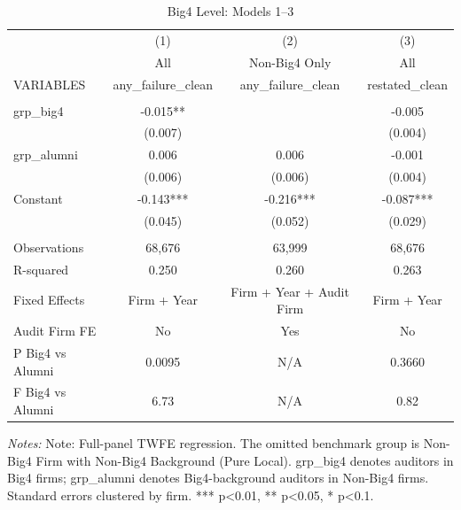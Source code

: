 \begin{table}[htbp]
\footnotesize
\centering
\caption{Big4 Level: Models 1--3}
\begin{threeparttable}
\begin{tabular}{p{}ccc}
\toprule
 & (1) & (2) & (3) \\
 & All & Non-Big4 Only & All \\
VARIABLES & any\_failure\_clean & any\_failure\_clean & restated\_clean \\
\midrule
 &  &  &  \\
grp\_big4 & -0.015** &  & -0.005 \\
 & (0.007) &  & (0.004) \\
grp\_alumni & 0.006 & 0.006 & -0.001 \\
 & (0.006) & (0.006) & (0.004) \\
Constant & -0.143*** & -0.216*** & -0.087*** \\
 & (0.045) & (0.052) & (0.029) \\
 &  &  &  \\
Observations & 68,676 & 63,999 & 68,676 \\
R-squared & 0.250 & 0.260 & 0.263 \\
Fixed Effects & Firm + Year & Firm + Year + Audit Firm & Firm + Year \\
Audit Firm FE & No & Yes & No \\
P Big4 vs Alumni & 0.0095 & N/A & 0.3660 \\
F Big4 vs Alumni & 6.73 & N/A & 0.82 \\
\bottomrule
\end{tabular}
\begin{tablenotes}\footnotesize
\item \raggedright \textit{Notes:} Note: Full-panel TWFE regression. The omitted benchmark group is Non-Big4 Firm with Non-Big4 Background (Pure Local). grp\_big4 denotes auditors in Big4 firms; grp\_alumni denotes Big4-background auditors in Non-Big4 firms. Standard errors clustered by firm. *** p<0.01, ** p<0.05, * p<0.1.
\end{tablenotes}
\end{threeparttable}
\end{table}

